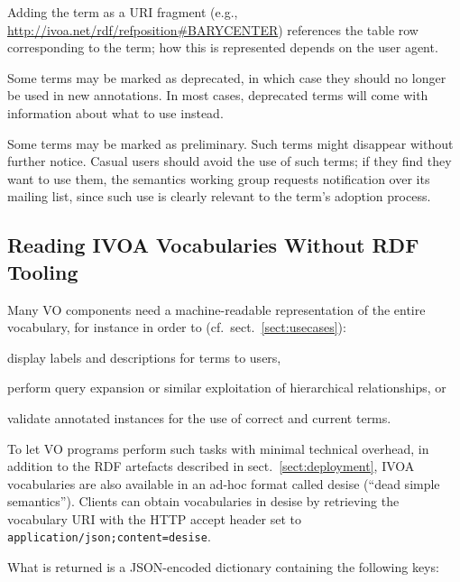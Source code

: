 \documentclass[11pt,a4paper]{ivoa}
\begin{document}
Adding the term as a URI fragment (e.g.,
\url{http://ivoa.net/rdf/refposition#BARYCENTER}) references the
table row corresponding to the term; how this is represented depends on
the user agent.

Some terms may be marked as deprecated, in which case they should no
longer be used in new annotations.  In most cases, deprecated terms will
come with information about what to use instead.

Some terms may be marked as preliminary.  Such terms might disappear
without further notice.  Casual users should avoid the use of such
terms; if they find they want to use them, the semantics working group
requests notification over its mailing list, since such use is clearly
relevant to the term's adoption process.


\subsection{Reading IVOA Vocabularies Without RDF Tooling}
\label{sect:desise}

Many VO components need a machine-readable representation of the
entire vocabulary, for instance in order to
(cf.~sect.~\ref{sect:usecases}):

\begin{compactitem}
\item display labels and descriptions for terms to users,
\item perform query expansion or similar exploitation of hierarchical
relationships, or
\item validate annotated instances for the use of correct and current
terms.
\end{compactitem}

To let VO programs perform such tasks with minimal technical overhead,
in addition to the RDF artefacts described in
sect.~\ref{sect:deployment}, IVOA vocabularies are also available in an
ad-hoc format called desise (``dead simple semantics'').  Clients can
obtain vocabularies in desise by retrieving the vocabulary URI with the
HTTP accept header set to \texttt{application/json;content=desise}.

What is returned is a JSON-encoded \citep{std:JSON} dictionary
containing the following keys:
\end{document}
